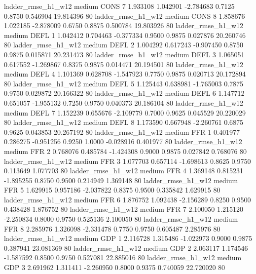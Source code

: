     ladder_rmse_h1_w12     medium     CONS                 7  1.933108 1.042901 -2.784683 0.7125 0.8750  0.546904   19.814396 80
    ladder_rmse_h1_w12     medium     CONS                 8  1.858676 1.022185 -2.878009 0.6750 0.8875  0.500784   19.803926 80
    ladder_rmse_h1_w12     medium     DEFL                 1  1.042412 0.704463 -0.377334 0.9500 0.9875  0.027876   20.260746 80
    ladder_rmse_h1_w12     medium     DEFL                 2  1.004292 0.617243 -0.907450 0.8750 0.9875  0.015871   20.231473 80
    ladder_rmse_h1_w12     medium     DEFL                 3  1.065051 0.617552 -1.269867 0.8375 0.9875  0.014471   20.194501 80
    ladder_rmse_h1_w12     medium     DEFL                 4  1.101369 0.628708 -1.547923 0.7750 0.9875  0.020713   20.172894 80
    ladder_rmse_h1_w12     medium     DEFL                 5  1.125443 0.638981 -1.765003 0.7875 0.9750  0.029872   20.166322 80
    ladder_rmse_h1_w12     medium     DEFL                 6  1.147712 0.651057 -1.955132 0.7250 0.9750  0.040373   20.186104 80
    ladder_rmse_h1_w12     medium     DEFL                 7  1.152239 0.655676 -2.109779 0.7000 0.9625  0.045529   20.220029 80
    ladder_rmse_h1_w12     medium     DEFL                 8  1.173590 0.667948 -2.260761 0.6875 0.9625  0.043853   20.267192 80
    ladder_rmse_h1_w12     medium      FFR                 1  0.401977 0.286275 -0.951256 0.9250 1.0000 -0.028916    0.401977 80
    ladder_rmse_h1_w12     medium      FFR                 2  0.768076 0.485784 -1.424308 0.9000 0.9875  0.027842    0.768076 80
    ladder_rmse_h1_w12     medium      FFR                 3  1.077703 0.657114 -1.698613 0.8625 0.9750  0.113649    1.077703 80
    ladder_rmse_h1_w12     medium      FFR                 4  1.369148 0.815231 -1.895255 0.8750 0.9500  0.214949    1.369148 80
    ladder_rmse_h1_w12     medium      FFR                 5  1.629915 0.957186 -2.037822 0.8375 0.9500  0.335842    1.629915 80
    ladder_rmse_h1_w12     medium      FFR                 6  1.876752 1.092438 -2.156289 0.8250 0.9500  0.438428    1.876752 80
    ladder_rmse_h1_w12     medium      FFR                 7  2.100050 1.215120 -2.250834 0.8000 0.9750  0.525136    2.100050 80
    ladder_rmse_h1_w12     medium      FFR                 8  2.285976 1.326098 -2.331478 0.7750 0.9750  0.605487    2.285976 80
    ladder_rmse_h1_w12     medium      GDP                 1  2.116728 1.315486 -1.022973 0.9000 0.9875  0.387941   23.081369 80
    ladder_rmse_h1_w12     medium      GDP                 2  2.063117 1.174546 -1.587592 0.8500 0.9750  0.527081   22.885016 80
    ladder_rmse_h1_w12     medium      GDP                 3  2.691962 1.311411 -2.260950 0.8000 0.9375  0.740059   22.720020 80
